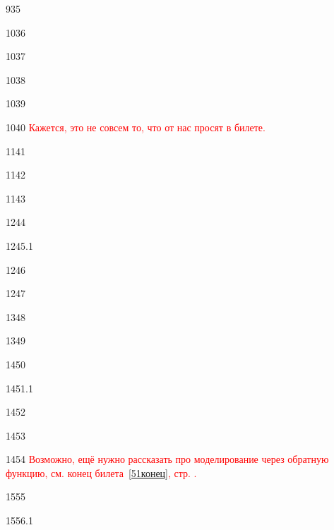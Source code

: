{9}{35}

{10}{36}

{10}{37}

{10}{38}

{10}{39}

{10}{40}
\textcolor{red}{Кажется, это не совсем то, что от нас просят в билете.}

{11}{41}

{11}{42}

{11}{43}

{12}{44}

{12}{45.1}

{12}{46}

{12}{47}

{13}{48}

{13}{49}

{14}{50}

{14}{51.1}
\label{51конец}

{14}{52}

{14}{53}

{14}{54}
\textcolor{red}{Возможно, ещё нужно рассказать про моделирование через обратную функцию, см. конец билета~\ref{51конец}, стр. \pageref{51конец}.}

{15}{55}

{15}{56.1}


